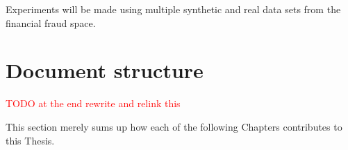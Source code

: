 Experiments will be made using multiple synthetic and real data sets from the financial fraud space.

\section{Document structure} 

\textcolor{red}{TODO at the end rewrite and relink this}

This section merely sums up how each of the following Chapters contributes to this Thesis.




